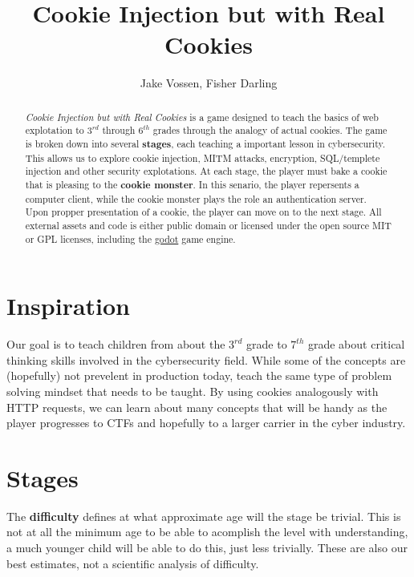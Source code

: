 \documentclass{article}
\begin{document}
\title{Cookie Injection but with Real Cookies}
\author{Jake Vossen, Fisher Darling}

\maketitle

\begin{abstract}
  
\textit{Cookie Injection but with Real Cookies} is a game designed to
teach the basics of web explotation to $3^{rd}$ through $6^{th}$
grades through the analogy of actual cookies. The game is broken down
into several \textbf{stages}, each teaching a important lesson in
cybersecurity. This allows us to explore cookie injection, MITM
attacks, encryption, SQL/templete injection and other security
explotations. At each stage, the player must bake a cookie that is
pleasing to the \textbf{cookie monster}. In this senario, the player
repersents a computer client, while the cookie monster plays the role
an authentication server. Upon propper presentation of a cookie, the
player can move on to the next stage. All external assets and code is
either public domain or licensed under the open source MIT or GPL
licenses, including the \href{https://godotengine.org}{godot} game
engine.



\end{abstract}

\section{Inspiration}

Our goal is to teach children from about the $3^{rd}$ grade to
$7^{th}$ grade about critical thinking skills involved in the cybersecurity
field. While some of the concepts are (hopefully) not prevelent in
production today, teach the same type of problem solving mindset that
needs to be taught. By using cookies analogously with HTTP requests,
we can learn about many concepts that will be handy as the player
progresses to CTFs and hopefully to a larger carrier in the cyber
industry. 

\section{Stages}

The \textbf{difficulty} defines at what approximate age will the stage
be trivial. This is not at all the minimum age to be able to acomplish
the level with understanding, a much younger child will be able to do
this, just less trivially. These are also our best estimates, not a
scientific analysis of difficulty.
\end{document}
